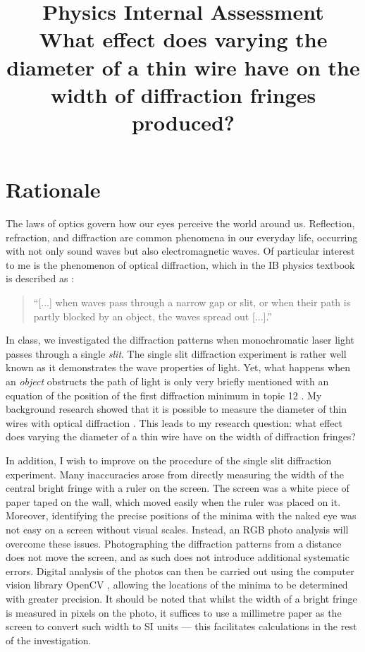 \documentclass[a4paper, 12pt]{article}
\title{
\textbf{Physics Internal Assessment}\\
\bigskip
What effect does varying the diameter of a thin wire have on the width of diffraction fringes produced?
}
\author{}
\date{}
\begin{document}
\maketitle

\section{Rationale}
The laws of optics govern how our eyes perceive the world around us. 
Reflection, refraction, and diffraction are common phenomena in our everyday life, occurring with not only sound waves but also electromagnetic waves. 
Of particular interest to me is the phenomenon of optical diffraction, which in the IB physics textbook is described as \autocite[151]{textbook}: 
\begin{quote}
``[...] when waves pass through a narrow gap or slit, or when their path is partly blocked by an object, the waves spread out [...].''    
\end{quote}

In class, we investigated the diffraction patterns when monochromatic laser light passes through a single \textit{slit}. 
The single slit diffraction experiment is rather well known as it demonstrates the wave properties of light. 
Yet, what happens when an \textit{object} obstructs the path of light is only very briefly mentioned with an equation of the position of the first diffraction minimum in topic 12 \autocite[495]{textbook}. 
My background research showed that it is possible to measure the diameter of thin wires with optical diffraction \autocite{wire_measurement}. 
This leads to my research question: 
what effect does varying the diameter of a thin wire have on the width of diffraction fringes?

In addition, I wish to improve on the procedure of the single slit diffraction experiment.
Many inaccuracies arose from directly measuring the width of the central bright fringe with a ruler on the screen.
The screen was a white piece of paper taped on the wall, which moved easily when the ruler was placed on it. 
Moreover, identifying the precise positions of the minima with the naked eye was not easy on a screen without visual scales.
Instead, an RGB photo analysis will overcome these issues.
Photographing the diffraction patterns from a distance does not move the screen, and as such does not introduce additional systematic errors.
Digital analysis of the photos can then be carried out using the computer vision library OpenCV \autocite{opencv_library}, allowing the locations of the minima to be determined with greater precision.
It should be noted that whilst the width of a bright fringe is measured in pixels on the photo, it suffices to use a millimetre paper as the screen to convert such width to SI units --- this facilitates calculations in the rest of the investigation.
\end{document}
